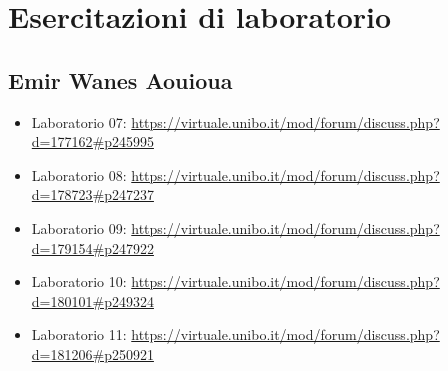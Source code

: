 \documentclass[a4paper,12pt]{report}
\begin{document}
\chapter{Esercitazioni di laboratorio}
\section{Emir Wanes Aouioua}
\begin{itemize}
	\item Laboratorio 07: \url{https://virtuale.unibo.it/mod/forum/discuss.php?d=177162#p245995}
	\item Laboratorio 08: \url{https://virtuale.unibo.it/mod/forum/discuss.php?d=178723#p247237}
	\item Laboratorio 09: \url{https://virtuale.unibo.it/mod/forum/discuss.php?d=179154#p247922}
	\item Laboratorio 10: \url{https://virtuale.unibo.it/mod/forum/discuss.php?d=180101#p249324}
	\item Laboratorio 11: \url{https://virtuale.unibo.it/mod/forum/discuss.php?d=181206#p250921}
\end{itemize}
\end{document}
